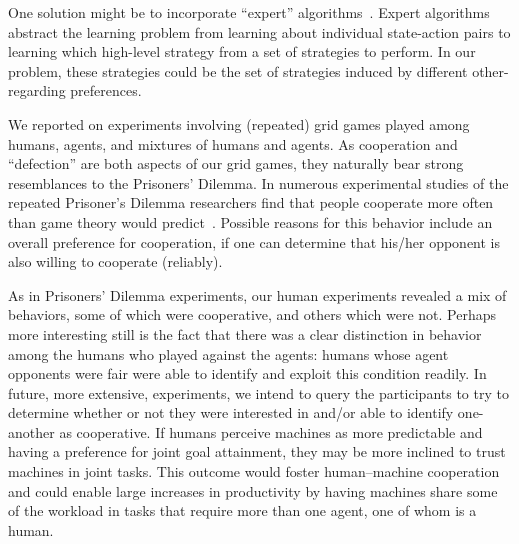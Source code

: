 \documentclass[letterpaper]{article}
\begin{document}

One solution might be to incorporate ``expert''
algorithms~\cite{crandall14,megiddo05}. Expert algorithms abstract the
learning problem from learning about individual state-action pairs to
learning which high-level strategy from a set of strategies to
perform. In our problem, these strategies could be the set of
strategies induced by different other-regarding preferences.

We reported on experiments involving (repeated) grid games played
among humans, agents, and mixtures of humans and agents.  As
cooperation and ``defection'' are both aspects of our grid games, they
naturally bear strong resemblances to the Prisoners' Dilemma.  In
numerous experimental studies of the repeated Prisoner's Dilemma
researchers find that people cooperate more often than game theory
would predict~\cite{camerer03}.  Possible reasons for this behavior
include an overall preference for cooperation, if one can determine
that his/her opponent is also willing to cooperate (reliably).

As in Prisoners' Dilemma experiments, our human experiments revealed a
mix of behaviors, some of which were cooperative, and others which
were not.  Perhaps more interesting still is the fact that there was a
clear distinction in behavior among the humans who played against the
agents: humans whose agent opponents were fair were able to identify
and exploit this condition readily.  In future, more extensive,
experiments, we intend to query the participants to try to determine
whether or not they were interested in and/or able to identify
one-another as cooperative.  If humans perceive machines as more
predictable and having a preference for joint goal attainment, they
may be more inclined to trust machines in joint tasks. This outcome
would foster human--machine cooperation and could enable large
increases in productivity by having machines share some of the
workload in tasks that require more than one agent, one of whom is a
human.



\end{document}
